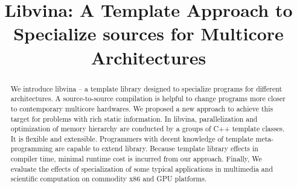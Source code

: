 \documentclass[10pt, conference, compsocconf]{IEEEtran}
\begin{document}
%
\title{Libvina: A Template Approach to Specialize sources for Multicore Architectures}





% 
\author{}








\maketitle


\begin{abstract}
We introduce libvina -- a template library designed to specialize programs for different architectures. A source-to-source compilation is helpful to change programs more closer to contemporary multicore hardwares. We proposed a new approach to achieve this target for problems with rich static information. In libvina, parallelization and optimization of memory hierarchy are conducted by a groups of C++ template classes. It is flexible and extensible. Programmers with decent knowledge of template meta-programming are capable to extend library. Because template library effects in compiler time, minimal runtime cost is incurred from our approach. Finally, We evaluate the effects of specialization of some typical applications in multimedia and scientific computation on commodity x86 and GPU platforms.
\end{abstract}
\end{document}
